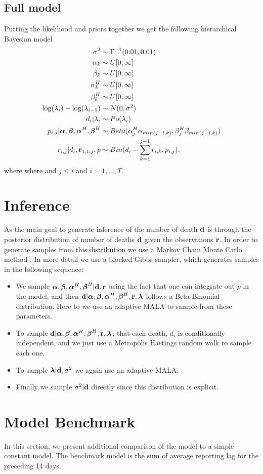 \subsection{Full model}
Putting the likelihood and priors together we get the following hierarchical Bayesian model
\begin{align*}
\sigma^2 &\sim \Gamma^{-1}(0.01,0.01) \\
\alpha_k &\sim U[0,\infty] \\
\beta_k &\sim U[0,\infty] \\
\alpha_k^H &\sim U[0,\infty] \\
\beta_k^H &\sim U[0,\infty] \\
\log(\lambda_i) - \log(\lambda_{i-1}) &\sim N(0,\sigma^2)\\
d_i| \lambda_i  &\sim Po(\lambda_i) \\
p_{i,j}|  {\boldsymbol{\mathrm{\alpha}}},{\boldsymbol{\mathrm{\beta}}}, {\boldsymbol{\mathrm{\alpha}}}^H,{\boldsymbol{\mathrm{\beta}}}^H &\sim Beta(\alpha^H_j\alpha_{min(j-i,k)},\beta^H_j\beta_{min(j-i,k)}) \\
r_{i,j}|d_i,{\boldsymbol{\mathrm{r}}}_{1,1:j},p &\sim Bin(d_i - \sum_{k=1}^{j-1}r_{i,k}, p_{i,j}),
\end{align*}
where where and $j\leq i$ and $i=1,\ldots,T$.

\section{Inference}
As the main goal to generate inference of the number of death ${\boldsymbol{\mathrm{d}}}$ is through the posterior distribution of number of deaths ${\boldsymbol{\mathrm{d}}}$ given the observations ${\boldsymbol{\mathrm{r}}}$.
In order to generate samples from this distribution we use a Markov Chain Monte Carlo method \cite{Brooks2011_handbook_markov}. In more detail we use a blocked Gibbs sampler, which generates samples in the following sequence:
\begin{itemize}
	\item  We sample ${\boldsymbol{\mathrm{\alpha}}},{\boldsymbol{\mathrm{\beta}}}, {\boldsymbol{\mathrm{\alpha}}}^H,{\boldsymbol{\mathrm{\beta}}}^H|{\boldsymbol{\mathrm{d}}}, {\boldsymbol{\mathrm{r}}}$ using the fact that one can integrate out $p$ in the model, and then  ${\boldsymbol{\mathrm{d}}}|{\boldsymbol{\mathrm{\alpha}}},{\boldsymbol{\mathrm{\beta}}}, {\boldsymbol{\mathrm{\alpha}}}^H,{\boldsymbol{\mathrm{\beta}}}^H,{\boldsymbol{\mathrm{r}}},{\boldsymbol{\mathrm{\lambda}}}$  follows a Beta-Binomial distribution. Here to we use an adaptive MALA \cite{Atchade2006_adaptive_version} to sample from these parameters.
	\item  To sample ${\boldsymbol{\mathrm{d}}}|{\boldsymbol{\mathrm{\alpha}}},{\boldsymbol{\mathrm{\beta}}}, {\boldsymbol{\mathrm{\alpha}}}^H,{\boldsymbol{\mathrm{\beta}}}^H,{\boldsymbol{\mathrm{r}}},{\boldsymbol{\mathrm{\lambda}}}$, that each death, $d_i$ is conditionally independent, and we just use a Metropolis Hastings random walk to sample each one.
	\item To sample ${\boldsymbol{\mathrm{\lambda}}} | {\boldsymbol{\mathrm{d}}},\sigma^2$ we again use an adaptive MALA.
	\item Finally we sample $\sigma^2|{\boldsymbol{\mathrm{d}}}$ directly since this distribution is explicit.
\end{itemize}

\section{Model Benchmark}
In this section, we present additional comparison of the model to a simple constant model. The benchmark model is the sum of average reporting lag for the preceding 14 days.


% 
% 
% 



